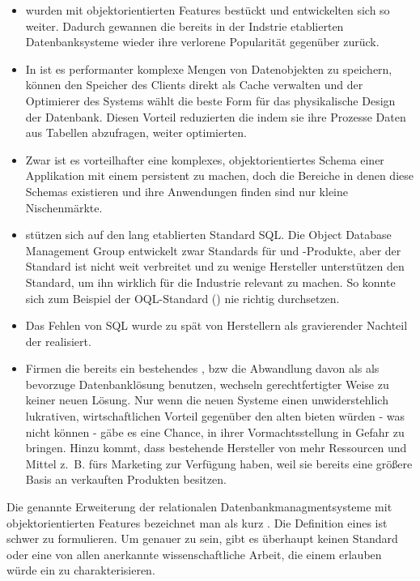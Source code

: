 \begin{itemize}
\item \RDBMSs wurden mit objektorientierten Features bestückt und entwickelten sich so weiter. Dadurch gewannen die bereits in der Indstrie etablierten Datenbanksysteme wieder ihre verlorene Popularität gegenüber \ODBMSs zurück.
\item In \ODBMS ist es performanter komplexe Mengen von Datenobjekten zu speichern, \ODBMS können den Speicher des Clients direkt als Cache verwalten und der Optimierer des Systems wählt die beste Form für das physikalische Design der Datenbank. Diesen Vorteil reduzierten die \RDBMSs indem sie ihre Prozesse Daten aus Tabellen abzufragen, weiter optimierten.
\item Zwar ist es vorteilhafter eine komplexes, objektorientiertes Schema einer Applikation mit einem \ODBMS persistent zu machen, doch die Bereiche in denen diese Schemas existieren und \ODBMSs ihre Anwendungen finden sind nur kleine Nischenmärkte.
\item \RDBMSs stützen sich auf den lang etablierten Standard SQL. Die Object Database Management Group entwickelt zwar Standards für \ODBMSs und \ORM-Produkte, aber der Standard ist nicht weit verbreitet und zu wenige Hersteller unterstützen den Standard, um ihn wirklich für die Industrie relevant zu machen. So konnte sich zum Beispiel der OQL-Standard () nie richtig durchsetzen.
\item Das Fehlen von SQL wurde zu spät von Herstellern als gravierender Nachteil der \ODBMSs realisiert.
\item Firmen die bereits ein bestehendes \RDBMS, bzw die Abwandlung davon als \ORDBMS als bevorzuge Datenbanklösung benutzen, wechseln gerechtfertigter Weise zu keiner neuen Lösung. Nur wenn die neuen Systeme einen unwiderstehlich lukrativen, wirtschaftlichen Vorteil gegenüber den alten bieten würden - was \ODBMS nicht können - gäbe es eine Chance, \RDBMSs in ihrer Vormachtsstellung in Gefahr zu bringen. Hinzu kommt, dass bestehende Hersteller von \RDBMSs mehr Ressourcen und Mittel z.~B. fürs Marketing zur Verfügung haben, weil sie bereits eine größere Basis an verkauften Produkten besitzen.
\end{itemize}
Die genannte Erweiterung der relationalen Datenbankmanagmentsysteme mit objektorientierten Features bezeichnet man als %
 kurz \ORDBMS. Die Definition eines \ORDBMS ist schwer zu formulieren. Um genauer zu sein, gibt es überhaupt keinen Standard oder eine von allen anerkannte wissenschaftliche Arbeit, die einem erlauben würde ein \ORDBMS zu charakterisieren. \\
